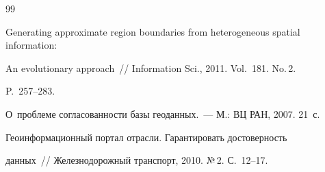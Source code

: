 {{\begin{thebibliography}{99}




Generating approximate region boundaries from heterogeneous spatial information: 


An evolutionary approach~/\!\!/ Information Sci., 2011. Vol.~181. No.\,2. 


P.~257--283.









О~проблеме согласованности базы геоданных.~--- М.: ВЦ РАН, 2007. 21~с.





 \label{end\stat}









Геоинформационный портал отрасли. Гарантировать достоверность 


данных~/\!\!/ Железнодорожный транспорт, 2010. №\,2.  С.~12--17.


\end{thebibliography}


}


}    


